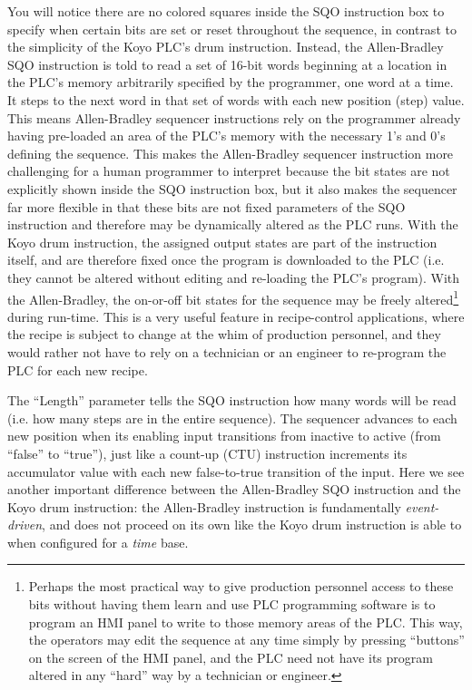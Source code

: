 You will notice there are no colored squares inside the SQO instruction box to specify when certain bits are set or reset throughout the sequence, in contrast to the simplicity of the Koyo PLC's drum instruction.  Instead, the Allen-Bradley SQO instruction is told to read a set of 16-bit words beginning at a location in the PLC's memory arbitrarily specified by the programmer, one word at a time.  It steps to the next word in that set of words with each new position (step) value.  This means Allen-Bradley sequencer instructions rely on the programmer already having pre-loaded an area of the PLC's memory with the necessary 1's and 0's defining the sequence.  This makes the Allen-Bradley sequencer instruction more challenging for a human programmer to interpret because the bit states are not explicitly shown inside the SQO instruction box, but it also makes the sequencer far more flexible in that these bits are not fixed parameters of the SQO instruction and therefore may be dynamically altered as the PLC runs.  With the Koyo drum instruction, the assigned output states are part of the instruction itself, and are therefore fixed once the program is downloaded to the PLC (i.e. they cannot be altered without editing and re-loading the PLC's program).  With the Allen-Bradley, the on-or-off bit states for the sequence may be freely altered\footnote{Perhaps the most practical way to give production personnel access to these bits without having them learn and use PLC programming software is to program an HMI panel to write to those memory areas of the PLC.  This way, the operators may edit the sequence at any time simply by pressing ``buttons'' on the screen of the HMI panel, and the PLC need not have its program altered in any ``hard'' way by a technician or engineer.} during run-time.  This is a very useful feature in recipe-control applications, where the recipe is subject to change at the whim of production personnel, and they would rather not have to rely on a technician or an engineer to re-program the PLC for each new recipe.

The ``Length'' parameter tells the SQO instruction how many words will be read (i.e. how many steps are in the entire sequence).  The sequencer advances to each new position when its enabling input transitions from inactive to active (from ``false'' to ``true''), just like a count-up (CTU) instruction increments its accumulator value with each new false-to-true transition of the input.  Here we see another important difference between the Allen-Bradley SQO instruction and the Koyo drum instruction: the Allen-Bradley instruction is fundamentally \textit{event-driven}, and does not proceed on its own like the Koyo drum instruction is able to when configured for a \textit{time} base.

